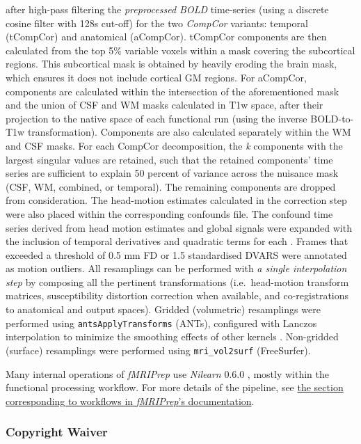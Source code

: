 \documentclass[]{article}
\begin{document}
\begin{description}
after high-pass filtering the \emph{preprocessed BOLD} time-series
(using a discrete cosine filter with 128s cut-off) for the two
\emph{CompCor} variants: temporal (tCompCor) and anatomical (aCompCor).
tCompCor components are then calculated from the top 5\% variable voxels
within a mask covering the subcortical regions. This subcortical mask is
obtained by heavily eroding the brain mask, which ensures it does not
include cortical GM regions. For aCompCor, components are calculated
within the intersection of the aforementioned mask and the union of CSF
and WM masks calculated in T1w space, after their projection to the
native space of each functional run (using the inverse BOLD-to-T1w
transformation). Components are also calculated separately within the WM
and CSF masks. For each CompCor decomposition, the \emph{k} components
with the largest singular values are retained, such that the retained
components' time series are sufficient to explain 50 percent of variance
across the nuisance mask (CSF, WM, combined, or temporal). The remaining
components are dropped from consideration. The head-motion estimates
calculated in the correction step were also placed within the
corresponding confounds file. The confound time series derived from head
motion estimates and global signals were expanded with the inclusion of
temporal derivatives and quadratic terms for each
\citep{confounds_satterthwaite_2013}. Frames that exceeded a threshold
of 0.5 mm FD or 1.5 standardised DVARS were annotated as motion
outliers. All resamplings can be performed with \emph{a single
interpolation step} by composing all the pertinent transformations
(i.e.~head-motion transform matrices, susceptibility distortion
correction when available, and co-registrations to anatomical and output
spaces). Gridded (volumetric) resamplings were performed using
\texttt{antsApplyTransforms} (ANTs), configured with Lanczos
interpolation to minimize the smoothing effects of other kernels
\citep{lanczos}. Non-gridded (surface) resamplings were performed using
\texttt{mri\_vol2surf} (FreeSurfer).
\end{description}

Many internal operations of \emph{fMRIPrep} use \emph{Nilearn} 0.6.0
\citep[RRID:SCR\_001362]{nilearn}, mostly within the functional
processing workflow. For more details of the pipeline, see
\href{https://fmriprep.readthedocs.io/en/latest/workflows.html}{the
section corresponding to workflows in \emph{fMRIPrep}'s documentation}.

\hypertarget{copyright-waiver}{%
\subsubsection{Copyright Waiver}\label{copyright-waiver}}
\end{document}
